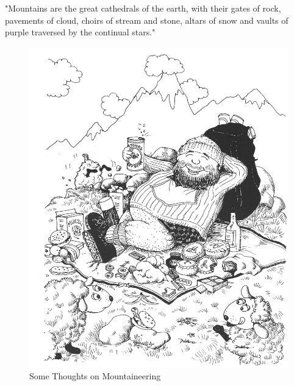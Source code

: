 \documentclass[a5paper,openany,font 10pt]{scrbook}
\begin{document}
"Mountains are the great cathedrals of the earth, with their
gates of rock, pavements of cloud, choirs of stream and stone,
altars of snow and vaults of purple traversed by the continual
stars."
\begin{figure}[htb]
\centering
\includegraphics[width=.9\linewidth]{./images/Cartoon_16.jpg}
\caption{\label{fig:orge479946}
Some Thoughts on Mountaineering}
\end{figure}
\end{document}
